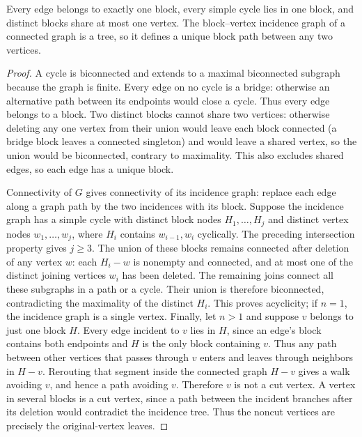 \begin{lemma}
\label{lem:a-pre-incidence}
Every edge belongs to exactly one block, every simple cycle lies in one
block, and distinct blocks share at most one vertex. The block--vertex
incidence graph of a connected graph is a tree, so it defines a unique
block path between any two vertices.
\end{lemma}
\begin{proof}
A cycle is biconnected and extends to a maximal biconnected subgraph
because the graph is finite. Every edge on no cycle is a bridge:
otherwise an alternative path between its endpoints would close a
cycle. Thus every edge belongs to a block. Two distinct blocks cannot
share two vertices: otherwise deleting any one vertex from their union
would leave each block connected (a bridge block leaves a connected
singleton) and would leave a shared vertex, so the union would be
biconnected, contrary to maximality. This also excludes shared edges,
so each edge has a unique block.

Connectivity of $G$ gives connectivity of its incidence graph: replace
each edge along a graph path by the two incidences with its block.
Suppose the incidence graph has a simple cycle with distinct block
nodes $H_1,\ldots,H_j$ and distinct vertex nodes
$w_1,\ldots,w_j$, where $H_i$ contains $w_{i-1},w_i$ cyclically.
The preceding intersection property gives $j\ge3$. The union of these
blocks remains connected after deletion of any vertex $w$: each
$H_i-w$ is nonempty and connected, and at most one of the distinct
joining vertices $w_i$ has been deleted. The remaining joins connect
all these subgraphs in a path or a cycle. Their union is therefore
biconnected, contradicting the maximality of the distinct $H_i$.
This proves acyclicity; if $n=1$, the incidence graph is a single vertex.
Finally, let $n>1$ and suppose $v$ belongs to just one block $H$.
Every edge incident to $v$ lies in $H$, since an edge's block contains
both endpoints and $H$ is the only block containing $v$. Thus any path
between other vertices that passes through $v$ enters and leaves through
neighbors in $H-v$. Rerouting that segment inside the connected graph
$H-v$ gives a walk avoiding $v$, and hence a path avoiding $v$.
Therefore $v$ is not a cut vertex. A vertex in several blocks is a cut
vertex, since a path between the incident branches after its deletion
would contradict the incidence tree. Thus the noncut vertices are
precisely the original-vertex leaves.
\end{proof}

